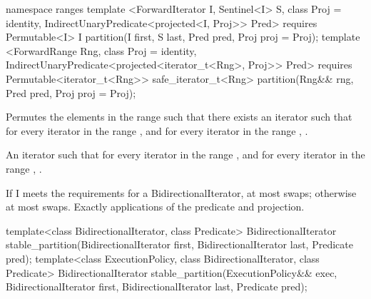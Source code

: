 \begin{addedblock}
%
\begin{itemdecl}
namespace ranges {
  template <ForwardIterator I, Sentinel<I> S, class Proj = identity,
            IndirectUnaryPredicate<projected<I, Proj>> Pred>
      requires Permutable<I>
    I partition(I first, S last, Pred pred, Proj proj = Proj{});
  template <ForwardRange Rng, class Proj = identity,
            IndirectUnaryPredicate<projected<iterator_t<Rng>, Proj>> Pred>
      requires Permutable<iterator_t<Rng>>
    safe_iterator_t<Rng> partition(Rng&& rng, Pred pred, Proj proj = Proj{});
}
\end{itemdecl}

\begin{itemdescr}
\pnum
\effects Permutes the elements in the range  such that there exists an iterator 
such that for every iterator  in the range 
, and for every iterator  in the
range , .

\pnum
\returns An iterator  such that for every iterator  in the range 
,
and for every iterator  in the range ,
.

\pnum
\complexity If I meets the requirements for a BidirectionalIterator, at most
 swaps; otherwise at most  swaps.
Exactly  applications of the predicate and projection.
\end{itemdescr}
\end{addedblock}

%
\begin{itemdecl}
template<class BidirectionalIterator, class Predicate>
  BidirectionalIterator
    stable_partition(BidirectionalIterator first, BidirectionalIterator last, Predicate pred);
template<class ExecutionPolicy, class BidirectionalIterator, class Predicate>
  BidirectionalIterator
    stable_partition(ExecutionPolicy&& exec,
                     BidirectionalIterator first, BidirectionalIterator last, Predicate pred);
\end{itemdecl}

